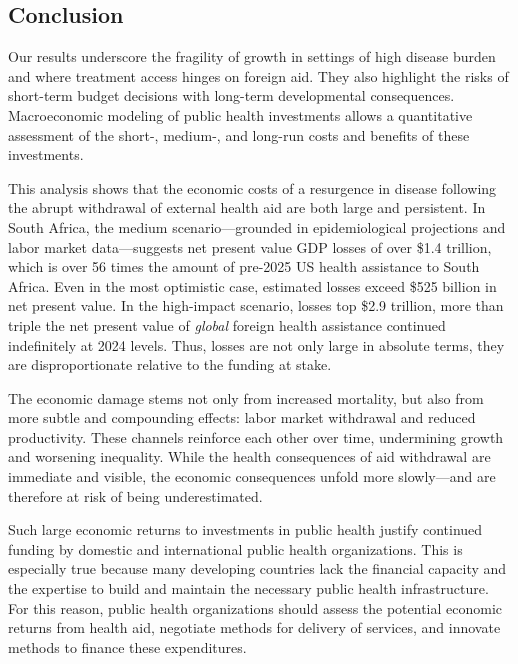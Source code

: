\documentclass[letterpaper,12pt]{article}
\theoremstyle{definition}
\begin{document}
\begin{spacing}{1.5}
\section{Conclusion}\label{SecConc}

Our results underscore the fragility of growth in settings of high disease burden and where treatment access hinges on foreign aid. They also highlight the risks of short-term budget decisions with long-term developmental consequences. Macroeconomic modeling of public health investments allows a quantitative assessment of the short-, medium-, and long-run costs and benefits of these investments.

This analysis shows that the economic costs of a resurgence in disease following the abrupt withdrawal of external health aid are both large and persistent. In South Africa, the medium scenario---grounded in epidemiological projections and labor market data---suggests net present value GDP losses of over \$\num{1.4} trillion, which is over 56 times the amount of pre-2025 US health assistance to South Africa. Even in the most optimistic case, estimated losses exceed \$525 billion in net present value. In the high-impact scenario, losses top \$\num{2.9} trillion, more than triple the net present value of \emph{global} foreign health assistance continued indefinitely at 2024 levels. Thus, losses are not only large in absolute terms, they are disproportionate relative to the funding at stake.

The economic damage stems not only from increased mortality, but also from more subtle and compounding effects: labor market withdrawal and reduced productivity. These channels reinforce each other over time, undermining growth and worsening inequality. While the health consequences of aid withdrawal are immediate and visible, the economic consequences unfold more slowly—and are therefore at risk of being underestimated.

Such large economic returns to investments in public health justify continued funding by domestic and international public health organizations. This is especially true because many developing countries lack the financial capacity and the expertise to build and maintain the necessary public health infrastructure. For this reason, public health organizations should assess the potential economic returns from health aid, negotiate methods for delivery of services, and innovate methods to finance these expenditures.

\end{spacing}
\end{document}
